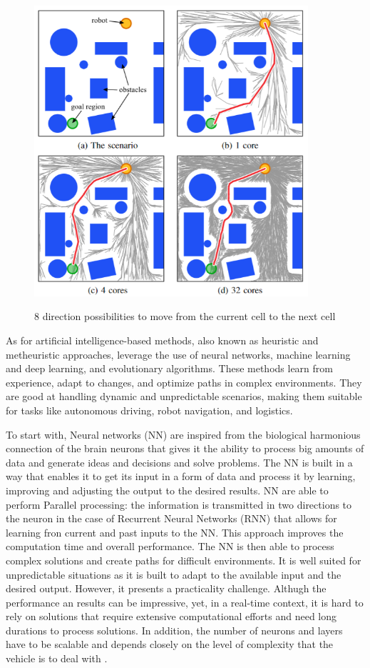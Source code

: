 \begin{figure}[H]
    \begin{center}
       \includegraphics[width=4in]{images/Chap1/sampling-based.png}\\
       \caption{8 direction possibilities to move from the current cell to the next cell \cite{R16}}
       \label{sampling-based}
       \end{center}
\end{figure}

As for artificial intelligence-based methods, also known as heuristic and metheuristic approaches, 
leverage the use of neural networks, machine learning and deep learning, and evolutionary algorithms. 
These methods learn from experience, adapt to changes, and optimize paths in complex environments. 
They are good at handling dynamic and unpredictable scenarios, making them suitable for tasks like 
autonomous driving, robot navigation, and logistics. 

To start with, Neural networks (NN) are inspired from the biological harmonious connection of the brain neurons
that gives it the ability to process big amounts of data and generate ideas and decisions and solve problems. 
The NN is built in a way that enables it to get its input in a form of data and process it by learning, improving 
and adjusting the output to the desired results. NN are able to perform Parallel processing: the information is 
transmitted in two
directions to the neuron in the case of Recurrent Neural Networks (RNN) that allows for learning fron current and 
past inputs to the NN. This approach improves the computation time and overall performance. 
The NN is then able to process complex solutions and create paths for difficult environments. 
It is well suited for unpredictable situations as it is built to adapt to the available input and the desired output.
However, it presents a practicality challenge. Althugh the performance an results can be impressive, yet, in a 
real-time context, 
it is hard to rely on solutions that require extensive computational efforts and need long durations to 
process solutions. In addition, the number of neurons and layers have to be scalable and depends closely on the 
level of complexity that the vehicle is to deal with \cite{R12}. 


